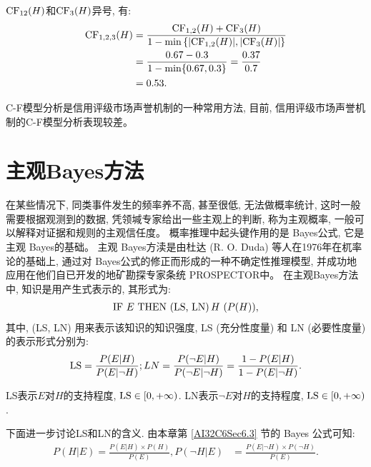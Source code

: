 $\textup{CF}_{12}(H)$和$\textup{CF}_3(H)$异号, 有:
\begin{align}
  \begin{aligned}
  \textup{CF}_{1,2,3}(H) &=\frac{\textup{CF}_{1,2}(H)+\textup{CF}_{3}(H)}{1-\min \left\{| \textup{CF}_{1,2}(H)|,| \textup{CF}_{3}(H)|\right\}} \\
                 &=\frac{0.67-0.3}{1-\min\{0.67,0.3\}}=\frac{0.37}{0.7} \\
                 &=0.53.
  \end{aligned}
\end{align}

\begin{remark}
    C-F模型分析是信用评级市场声誉机制的一种常用方法, 目前, 信用评级市场声誉机制的C-F模型分析表现较差。
\end{remark}
\section{主观Bayes方法}
在某些情况下, 同类事件发生的频率养不高, 甚至很低, 无法做概率统计, 这时一般需要根据观测到的数据, 凭领堿专家给出一些主观上的判断, 称为主观概率, 一般可以解释对证据和规则的主观信任度。
概率推理中起头键作用的是 Bayes公式, 它是主观 Bayes的基础。
主观 Bayes方渎是由杜达 (R. O. Duda) 等人在1976年在杌率论的基础上, 通过对 Bayes公式的修正而形成的一种不确定性推理模型, 并成功地应用在他们自已开发的地矿勘探专家条统 PROSPECTOR中。
在主观Bayes方法中, 知识是用产生式表示的, 其形式为:
\begin{align}
   \textup{IF} \,\, E\,\,  \textup{THEN}\,\,  \textup{(LS, LN)}\, H\,\,(P(H)),
\end{align}
其中, \textup{(LS, LN)} 用来表示该知识的知识强度, \textup{LS} (充分性度量) 和 \textup{LN} (必要性度量) 的表示形式分别为:
\begin{align}
\begin{aligned}
    \textup{LS} =\frac{P(E | H)}{P(E | \neg H)}; LN =\frac{P(\neg E | H)}{P(\neg E | \neg H)}=\frac{1-P(E | H)}{1-P(E | \neg H)}.
\end{aligned}
\end{align}
\begin{remark}
   \textup{LS}表示$E$对$H$的支持程度, $\textup{LS}\in [0,+\infty)$. \textup{LN}表示$\neg E$对$H$的支持程度, $\textup{LS}\in [0,+\infty)$.
\end{remark}
下面进一步讨论LS和LN的含义. 由本章第 \ref{AI32C6Sec6.3} 节的 Bayes 公式可知:
\begin{align}\label{AI32C6eq6.27}
    P(H | E) =\frac{P(E | H) \times P(H)}{P(E)},  P(\neg H | E) &=\frac{P(E | \neg H) \times P(\neg H)}{P(E)}.
\end{align}

